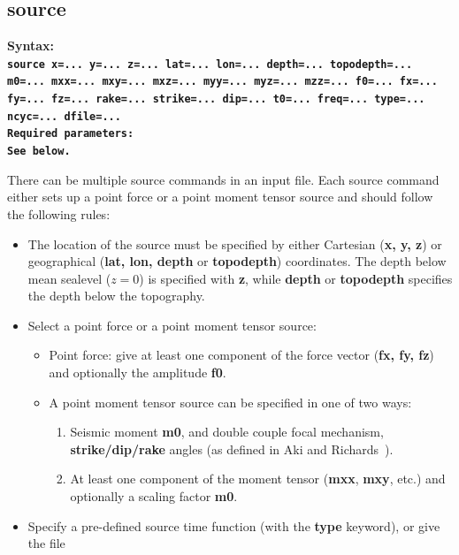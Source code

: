 \documentclass[11pt]{report}
\begin{document}
{\subsection{source}
\label{keyword:source}
\begin{flushleft}
	\bf
	Syntax:\\ \tt source
	x=... y=... z=... lat=... lon=... depth=... topodepth=... m0=... mxx=... mxy=... mxz=...
	myy=... myz=... mzz=... f0=... fx=... fy=... fz=... rake=... strike=... dip=... t0=...
	freq=... type=... ncyc=... dfile=...\\
	\bf
	Required parameters:\\ \rm See below.
\end{flushleft}
There can be multiple source commands in an input file. Each source command either sets up a point
force or a point moment tensor source and should follow the following rules:
\begin{itemize}
	\item The location of the source must be specified by either Cartesian ({\bf x, y, z}) or
	      geographical ({\bf lat, lon, depth} or {\bf topodepth}) coordinates. The depth below mean sealevel
	      ($z=0$) is specified with {\bf z}, while {\bf depth} or {\bf topodepth} specifies the depth below the
	      topography.
	\item Select a point force or a point moment tensor source:
	      \begin{itemize}
		      \item Point force: give at least one component of the force vector ({\bf fx, fy, fz}) and
		            optionally the amplitude {\bf f0}.
		      \item A point moment tensor source can be specified in one of two ways:
		            \begin{enumerate}
			            \item Seismic moment {\bf m0}, and double couple focal mechanism, {\bf strike/dip/rake} angles
			                  (as defined in Aki and Richards~\cite{Aki-Richards-02}).
			            \item At least one component of the moment tensor ({\bf mxx}, {\bf mxy}, etc.) and optionally a
			                  scaling factor {\bf m0}.
		            \end{enumerate}
	      \end{itemize}
	\item Specify a pre-defined source time function (with the {\bf type} keyword), or give the file

\end{itemize}}
\end{document}
